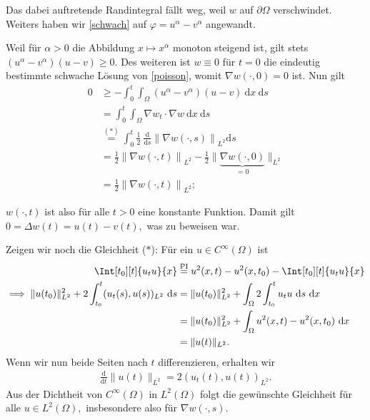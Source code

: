 \begin{solution}
Das dabei auftretende Randintegral fällt weg, weil $w$ auf $\partial\Omega$ verschwindet. Weiters haben wir \eqref{schwach} auf $\varphi = u^\alpha - v^\alpha$ angewandt.

Weil für $\alpha > 0$ die Abbildung $x \mapsto x^\alpha$ monoton steigend ist, gilt stets $(u^\alpha - v^\alpha) (u-v) \geq 0.$ Des weiteren ist $w \equiv 0$ für $t = 0$ die eindeutig bestimmte schwache Lösung von \eqref{poisson}, womit $\nabla w(\cdot, 0) = 0$ ist. Nun gilt
\begin{align*}
    0 &\geq - \int_0^t \int_\Omega (u^\alpha - v^\alpha) (u-v) \mathrm{~d}x \mathrm{~d}s\\
    &= \int_0^t \int_\Omega \nabla w_t \cdot \nabla w \mathrm{~d}x \mathrm{~d}s\\
    &\stackrel{(\ast)}{=} \int_0^t \frac{1}{2} ~\frac{\mathrm{d}}{\mathrm{d}s} \left\| \nabla w(\cdot, s)\right\|_{L^2} \mathrm{d}s\\
    &= \frac{1}{2} \left\| \nabla w(\cdot, t)\right\|_{L^2} - \frac{1}{2} \| \underbrace{\nabla w(\cdot, 0)}_{=0}\|_{L^2}\\
    &= \frac{1}{2} \left\| \nabla w(\cdot, t)\right\|_{L^2};
\end{align*}

$w(\cdot, t)$ ist also für alle $t > 0$ eine konstante Funktion. Damit gilt $0 = \Delta w(t) = u(t) - v(t),$ was zu beweisen war.

Zeigen wir noch die Gleichheit ($\ast$): Für ein $u \in C^\infty(\Omega)$ ist
\begin{align*}
    \Int[t_0][t]{u_t u}{x}
    & \stackrel
    {
      \mathrm{PI}
    }{=}
    u^2(x, t) - u^2(x, t_0) - \Int[t_0][t]{u_t u}{x} \\
    \implies
    \|u(t_0)\|^2_{L^2} + 2 \int_{t_0}^{t} (u_t(s), u(s))_{L^2} \mathrm{~d}s
    &= \|u(t_0)\|^2_{L^2} + \int_\Omega 2 \int_{t_0}^{t} u_t u \mathrm{~d}s \mathrm{~d}x\\
    &= \|u(t_0)\|^2_{L^2} + \int_\Omega u^2(x, t) - u^2(x, t_0) \mathrm{~d}x\\
    &= \| u(t)\|_{L^2}.
\end{align*}
Wenn wir nun beide Seiten nach $t$ differenzieren, erhalten wir
\begin{align*}
    \frac{\mathrm{d}}{\mathrm{d}t} \|u(t)\|_{L^2} = 2 \left(u_t(t), u(t)\right)_{L^2}.
\end{align*}
Aus der Dichtheit von $C^\infty(\Omega)$ in $L^2(\Omega)$ folgt die gewünschte Gleichheit für alle $u \in L^2(\Omega),$ insbesondere also für $\nabla w(\cdot, s).$
\end{solution}

